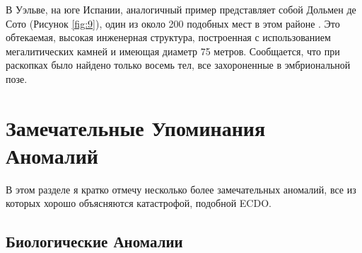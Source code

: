 \documentclass[10pt,twocolumn,letterpaper]{article}
\begin{document}
В Уэльве, на юге Испании, аналогичный пример представляет собой Дольмен де Сото (Рисунок \ref{fig:9}), один из около 200 подобных мест в этом районе \cite{72,32}. Это обтекаемая, высокая инженерная структура, построенная с использованием мегалитических камней и имеющая диаметр 75 метров. Сообщается, что при раскопках было найдено только восемь тел, все захороненные в эмбриональной позе.

\section{Замечательные Упоминания Аномалий}

В этом разделе я кратко отмечу несколько более замечательных аномалий, все из которых хорошо объясняются катастрофой, подобной ECDO.

\subsection{Биологические Аномалии}
\end{document}
